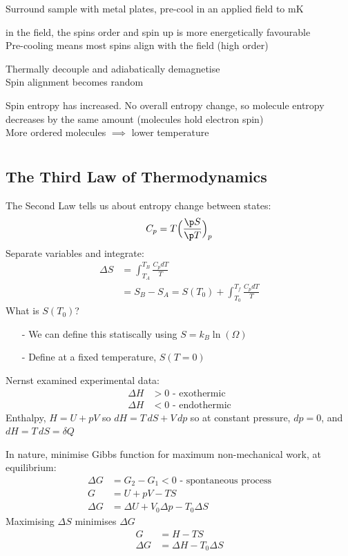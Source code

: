 \documentclass[a4paper, 11pt, normalem]{report}
\begin{document}
Surround sample with metal plates, pre-cool in an applied field to mK

in the field, the spins order and spin up is more energetically favourable \\
Pre-cooling means most spins align with the field (high order)

Thermally decouple and adiabatically demagnetise \\
Spin alignment becomes random

Spin entropy has increased. No overall entropy change, so molecule entropy decreases by the same amount (molecules hold electron spin) \\
More ordered molecules $\implies$ lower temperature

\chapter{}
\section{The Third Law of Thermodynamics}
The Second Law tells us about entropy change between states:
\begin{equation*}
    C_p = T\Big(\frac{\p S}{\p T}\Big)_p
\end{equation*}
Separate variables and integrate:
\begin{align*}
    \Delta S &= \int_{T_A}^{T_B} \frac{C_p dT}{T} \\
    &= S_B - S_A = S(T_0) + \int_{T_0}^{T_f} \frac{C_p dT}{T}
\end{align*}
What is $S(T_0)$?
\begin{itemize}
    \item[-] We can define this statiscally using $S = k_B \ln(\Omega)$
    \item[-] Define at a fixed temperature, $S(T = 0)$
\end{itemize}
Nernst examined experimental data:
\begin{align*}
    \Delta H &> 0 \text{ - exothermic} \\
    \Delta H &< 0 \text{ - endothermic}
\end{align*}
Enthalpy, $H = U + pV$ so $dH = T\,dS + V\,dp$ so at constant pressure, $dp = 0$, and $dH = T\,dS = \delta Q$

In nature, minimise Gibbs function for maximum non-mechanical work, at equilibrium:
\begin{align*}
    \Delta G &= G_2 - G_1 < 0 \text{ - spontaneous process} \\
    G &= U + pV - TS \\
    \Delta G &= \Delta U + V_0 \Delta p - T_0 \Delta S
\end{align*}
Maximising $\Delta S$ minimises $\Delta G$
\begin{align*}
    G &= H - TS \\
    \Delta G &= \Delta H - T_0 \Delta S
\end{align*}
\end{document}
